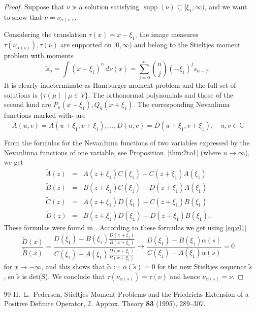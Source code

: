 \documentclass[10pt,a4paper]{amsart}
\newcommand{\C}{\mathbb{C}}
\DeclareMathOperator{\supp}{supp}
\begin{document}
\begin{proof} Suppose that $\nu$ is a solution satisfying $\supp(\nu)\subseteq [\xi_1,\infty)$, and we want to show that $\nu=\nu_{\alpha(s)}$.

Considering the translation $\tau(x)=x-\xi_1$,  the image measures $\tau(\nu_{\alpha(s)}), \tau(\nu)$ are supported on $[0,\infty)$ and belong to the Stieltjes moment problem  with moments
$$
\tilde{s}_n=\int (x-\xi_1)^n\,d\nu(x)=\sum_{j=0}^n\binom{n}{j} (-\xi_1)^js_{n-j}.
$$
It is clearly indeterminate as Hamburger moment problem and the full set of solutions is
$\{\tau(\mu)\mid \mu\in V\}$. The orthonormal polynomials and those of the second kind are $P_n(x+\xi_1),Q_n(x+\xi_1)$. The corresponding Nevanlinna functions marked with  $\tilde{}$ are
$$
\tilde{A}(u,v)=A(u+\xi_1,v+\xi_1),\ldots,\tilde{D}(u,v)=D(u+\xi_1,v+\xi_1),\quad u,v\in\C
$$

From the formulas for the Nevanlinna functions of two variables expressed by the Nevanlinna functions of one variable, see Proposition~\ref{thm:2to1} (where $n\to\infty$), we get
\begin{eqnarray*}
\tilde{A}(z)&=&A(z+\xi_1)C(\xi_1)-C(z+\xi_1)A(\xi_1)\\
\tilde{B}(z)&=&B(z+\xi_1)C(\xi_1)-D(z+\xi_1)A(\xi_1)\\
\tilde{C}(z)&=&A(z+\xi_1)D(\xi_1)-C(z+\xi_1)B(\xi_1)\\
\tilde{D}(z)&=&B(z+\xi_1)D(\xi_1)-D(z+\xi_1)B(\xi_1).
\end{eqnarray*}
These formulas were found in \cite[Proposition 3.3]{Pe1}.
According to these formulas we get using \eqref{eq:el1}
$$
\frac{\tilde{D}(x)}{\tilde{B}(x)}=\frac{D(\xi_1)-B(\xi_1)\frac{D(x+\xi_1)}{B(x+\xi_1)}}
{C(\xi_1)-A(\xi_1)\frac{D(x+\xi_1)}{B(x+\xi_1)}}\to \frac{D(\xi_1)-B(\xi_1)\alpha(s)}
{C(\xi_1)-A(\xi_1)\alpha(s)}=0
$$
for $x\to -\infty$,  and this shows that $\tilde{\alpha}:=\alpha(\tilde{s})=0$ for the new Stieltjes sequence $\tilde{s}$, so $\tilde{s}$ is det(S). We conclude that $\tau(\nu_{\alpha(s)})=\tau(\nu)$
and hence $\nu_{\alpha(s)}=\nu$.
\end{proof}

\begin{thebibliography}{99}
 H.~L.~Pedersen, Stieltjes Moment Problems and the Friedrichs Extension of a Positive Definite Operator, J. Approx. Theory {\bf 83} (1995), 289--307.
\end{thebibliography}
\end{document}
